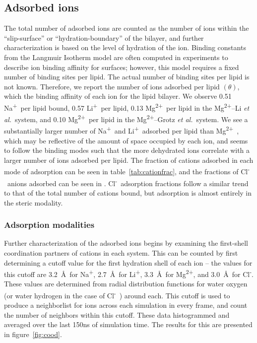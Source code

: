 \documentclass[journal=langd5,manuscript=article]{achemso}
\newcommand{\etal}{\textit{et al.}~}
\newcommand{\na}{Na\textsuperscript{+}~}
\newcommand{\cl}{Cl\textsuperscript{-}~}
\newcommand{\li}{Li\textsuperscript{+}~}
\newcommand{\mg}{Mg\textsuperscript{2+}~}
\newcommand{\mgmbnbfix}{Mg\textsuperscript{2+}--Li \etal} %
\newcommand{\mgmicro}{Mg\textsuperscript{2+}--Grotz \etal}
\begin{document}
\subsection{Adsorbed ions}
\label{sec:boundions}
The total number of adsorbed ions are counted as the number of ions within the ``slip-surface'' or ``hydration-boundary'' of the bilayer, and
further characterization is based on the level of hydration of the ion.
Binding constants from the Langmuir Isotherm model are often computed in experiments to describe ion binding affinity for
surfaces; however, this model requires a fixed number of binding sites per lipid. The actual number of binding sites
per lipid is not known. Therefore, we report the number of ions adsorbed per lipid $(\theta)$, which 
the binding affinity of each ion for the lipid bilayer.
We observe 0.51 \na per lipid bound, 0.57 \li per lipid, 0.13 \mg per lipid in the \mgmbnbfix system, and 0.10 \mg per lipid
in the \mgmicro system. We see a substantially larger number of \na and \li adsorbed per lipid than
\mg, which may be reflective of the amount of space occupied by each ion, and seems to follow the
binding modes such that the more dehydrated ions correlate with a larger number of ions adsorbed per lipid.
The fraction of cations adsorbed in each mode of adsorption can be seen in table~\ref{tab:cationfrac}, and the fractions
of \cl anions adsorbed can be seen in .
\cl adsorption fractions follow a similar trend to that of the total number of cations bound, but adsorption
is almost entirely in the steric modality.




\subsubsection{Adsorption modalities}

Further characterization of the adsorbed ions begins by examining the first-shell coordination partners of cations in each system.
This can be counted by first determining a cutoff value for the first hydration shell of each ion 
-- the values for this cutoff are
3.2~\AA~for Na\textsuperscript{+}, 2.7~\AA~for Li\textsuperscript{+}, 3.3~\AA~for Mg\textsuperscript{2+}, 
and 3.0~\AA~for Cl\textsuperscript{-}. 
These values are determined from radial distribution 
functions for water oxygen (or water hydrogen in the case of \cl) around each. 
This cutoff is used to produce a neighborlist for ions
across each simulation in every frame, and count the number of neighbors within this cutoff. 
These data  histogrammed and averaged over
the last 150ns of simulation time. The results for this are presented in figure~\ref{fig:cood}.
\end{document}
